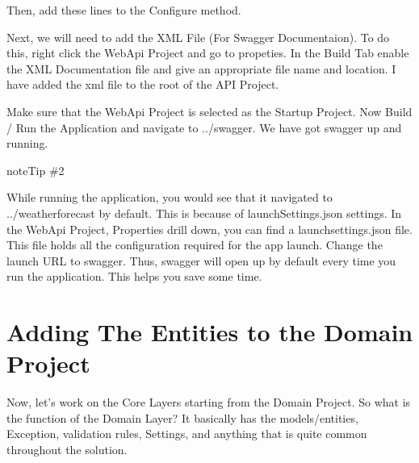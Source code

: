 \documentclass[letterpaper,10pt,english]{sphinxmanual}
\begin{document}
Then, add these lines to the Configure method.

\begin{sphinxVerbatim}[commandchars=\\\{\}]

 
     
\end{sphinxVerbatim}

Next, we will need to add the XML File (For Swagger Documentaion). To do this, right click the WebApi Project and go to propeties. In the Build Tab enable the XML Documentation file and give an appropriate file name and location. I have added the xml file to the root of the API Project.

\noindent{}

Make sure that the WebApi Project is selected as the Startup Project. Now Build / Run the Application and navigate to ../swagger. We have got swagger up and running.

\noindent{}

\begin{sphinxadmonition}{note}{Tip \#2}

While running the application, you would see that it navigated to ../weatherforecast by default. This is because of launchSettings.json settings. In the WebApi Project, Properties drill down, you can find a launchsettings.json file. This file holds all the configuration required for the app launch. Change the launch URL to swagger. Thus, swagger will open up by default every time you run the application. This helps you save some time.
\end{sphinxadmonition}

\noindent{}


\section{Adding The Entities to the Domain Project}
\label{\detokenize{OnionArchitecture/details:adding-the-entities-to-the-domain-project}}
Now, let’s work on the Core Layers starting from the Domain Project. So what is the function of the Domain Layer? It basically has the models/entities, Exception, validation rules, Settings, and anything that is quite common throughout the solution.
\end{document}
